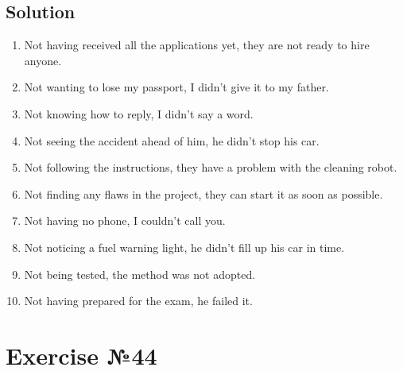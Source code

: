 \subsection*{Solution}
\begin{enumerate}
      \item Not having received all the applications yet, they are not ready to hire anyone.
      \item Not wanting to lose my passport, I didn't give it to my father.
      \item Not knowing how to reply, I didn't say a word.
      \item Not seeing the accident ahead of him, he didn't stop his car.
      \item Not following the instructions, they have a problem with the cleaning robot.
      \item Not finding any flaws in the project, they can start it as soon as possible.
      \item Not having no phone, I couldn't call you.
      \item Not noticing a fuel warning light, he didn't fill up his car in time.
      \item Not being tested, the method was not adopted.
      \item Not having prepared for the exam, he failed it.
\end{enumerate}

\section{Exercise №44}
